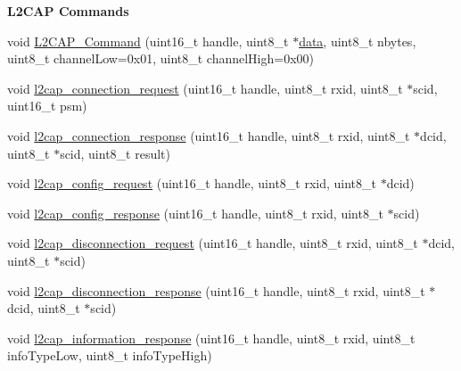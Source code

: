 \begin{Indent}{\bf \-L2\-C\-A\-P \-Commands}\par
\begin{DoxyCompactItemize}
\item 
void \hyperlink{class_b_t_d_aad7d8ef46e60b48ff4aaabefb0b290e7}{\-L2\-C\-A\-P\-\_\-\-Command} (uint16\-\_\-t handle, uint8\-\_\-t $\ast$\hyperlink{masstorage_8h_afb87d045bbf32b236fc425efe02bdc7b}{data}, uint8\-\_\-t nbytes, uint8\-\_\-t channel\-Low=0x01, uint8\-\_\-t channel\-High=0x00)
\item 
void \hyperlink{class_b_t_d_a55cf412a2053972a353b1ab964ca9d3e}{l2cap\-\_\-connection\-\_\-request} (uint16\-\_\-t handle, uint8\-\_\-t rxid, uint8\-\_\-t $\ast$scid, uint16\-\_\-t psm)
\item 
void \hyperlink{class_b_t_d_a7d34c62b1d561679dea5cd27356b38a7}{l2cap\-\_\-connection\-\_\-response} (uint16\-\_\-t handle, uint8\-\_\-t rxid, uint8\-\_\-t $\ast$dcid, uint8\-\_\-t $\ast$scid, uint8\-\_\-t result)
\item 
void \hyperlink{class_b_t_d_ab646a59311344966f139bb3b78f30233}{l2cap\-\_\-config\-\_\-request} (uint16\-\_\-t handle, uint8\-\_\-t rxid, uint8\-\_\-t $\ast$dcid)
\item 
void \hyperlink{class_b_t_d_a792ac4529b65235698ecf3d37982c05e}{l2cap\-\_\-config\-\_\-response} (uint16\-\_\-t handle, uint8\-\_\-t rxid, uint8\-\_\-t $\ast$scid)
\item 
void \hyperlink{class_b_t_d_ac7053ef7ac690be3afbbdd985b163f10}{l2cap\-\_\-disconnection\-\_\-request} (uint16\-\_\-t handle, uint8\-\_\-t rxid, uint8\-\_\-t $\ast$dcid, uint8\-\_\-t $\ast$scid)
\item 
void \hyperlink{class_b_t_d_a29d176d9194e5c92fbe54791fc245407}{l2cap\-\_\-disconnection\-\_\-response} (uint16\-\_\-t handle, uint8\-\_\-t rxid, uint8\-\_\-t $\ast$dcid, uint8\-\_\-t $\ast$scid)
\item 
void \hyperlink{class_b_t_d_a91f61915c503fe7b861c88f5b3e6733c}{l2cap\-\_\-information\-\_\-response} (uint16\-\_\-t handle, uint8\-\_\-t rxid, uint8\-\_\-t info\-Type\-Low, uint8\-\_\-t info\-Type\-High)
\end{DoxyCompactItemize}
\end{Indent}

